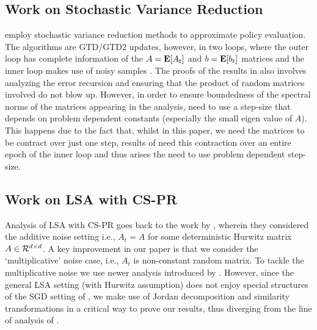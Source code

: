 \subsection{Work on Stochastic Variance Reduction}
\citet{lihong} employ stochastic variance reduction methods to approximate policy evaluation. The algorithms are GTD/GTD2 updates, however, in two loops, where the outer loop has complete information of the $A=\mathbf{E}[A_t]$ and $b=\mathbf{E}[b_t]$ matrices and the inner loop makes use of noisy samples \cite{lihong}. The proofs of the results in \cite{lihong} also involves analyzing the error recursion and ensuring that the product of random matrices involved do not blow up. However, in order to ensure boundedness of the spectral norms of the matrices appearing in the analysis, \citet{lihong} need to use a step-size that depends on problem dependent constants (especially the small eigen value of $A$). This happens due to the fact that, whilst in this paper, we need the matrices to be contract over just one step, results of \citet{lihong} need this contraction over an entire epoch of the inner loop and thus arises the need to use problem dependent step-size.
\subsection{Work on LSA with CS-PR}
 Analysis of LSA with CS-PR goes back to the work by \citet{polyak-judisky}, wherein they considered the additive noise setting i.e., $A_t=A$ for some deterministic Hurwitz matrix $A\in \mathcal{R}^{d \times d}$. A key improvement in our paper is that we consider the `multiplicative' noise case, i.e., $A_t$ is non-constant random matrix. To tackle the multiplicative noise we use newer analysis introduced by \citet{bach}. However, since the general LSA setting (with Hurwitz assumption) does not enjoy special structures of the SGD setting of \citet{bach}, we make use of Jordan decomposition and similarity transformations in a critical way to prove our results, thus diverging from the line of analysis of 
\citet{bach}.


